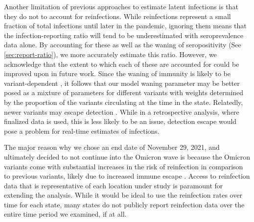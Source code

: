 Another limitation of previous approaches to estimate latent infections is that
they do not to account for reinfections. While reinfections represent a small
fraction of total infections until later in the pandemic, ignoring them means
that the infection-reporting ratio will tend to be underestimated with
seroprevalence data alone. By accounting for these as well as the waning of
seropositivity (See \autoref{sec:report-ratio}), we more accurately estimate
this ratio.
However, we acknowledge that the extent to which each of these are accounted for
could be improved upon in future work. Since the waning of immunity is likely to
be variant-dependent \citep{pooley2023durability}, it follows that our model
waning parameter may be better posed as a mixture of parameters for different
variants with weights determined by the proportion of the variants circulating
at the time in the state. Relatedly, newer variants may escape detection
\citep{nih2022assessing, fda2023sars}. While in a retrospective analysis, where
finalized data is used, this is less likely to be an issue, detection escape
would pose a problem for real-time estimates of infections.

The major reason why we chose an end date of November 29,
2021, and ultimately decided to not continue into the Omicron wave is because
the Omicron variants come with substantial increases in the risk of reinfection
in comparison to previous variants, likely due to increased immune escape
\citep{wei2024risk, pulliam2022increased, eythorsson2022rate}. Access to
reinfection data that is representative of each location under study is paramount
for extending the analysis. While it would be ideal to use the reinfection rates
over time for each \US state, many states do not publicly report reinfection
data over the entire time period we examined, if at all.



